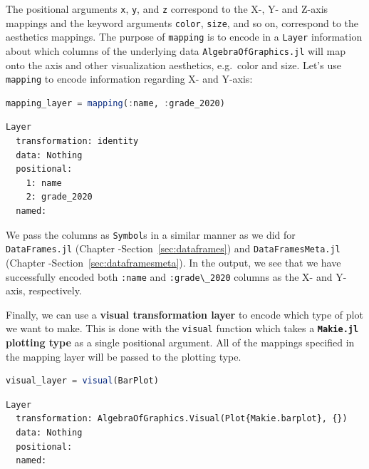 \documentclass[
  notoc %
]{tufte-book}
\newcommand{\passthrough}[1]{#1}
\begin{document}
The positional arguments \passthrough{\lstinline!x!},
\passthrough{\lstinline!y!}, and \passthrough{\lstinline!z!} correspond
to the X-, Y- and Z-axis mappings and the keyword arguments
\passthrough{\lstinline!color!}, \passthrough{\lstinline!size!}, and so
on, correspond to the aesthetics mappings. The purpose of
\passthrough{\lstinline!mapping!} is to encode in a
\passthrough{\lstinline!Layer!} information about which columns of the
underlying data \passthrough{\lstinline!AlgebraOfGraphics.jl!} will map
onto the axis and other visualization aesthetics, e.g.~color and size.
Let's use \passthrough{\lstinline!mapping!} to encode information
regarding X- and Y-axis:

\begin{lstlisting}[language=Julia]
mapping_layer = mapping(:name, :grade_2020)
\end{lstlisting}

\begin{lstlisting}[language=Output]
Layer 
  transformation: identity
  data: Nothing
  positional:
    1: name
    2: grade_2020
  named:

\end{lstlisting}

We pass the columns as \passthrough{\lstinline!Symbol!}s in a similar
manner as we did for \passthrough{\lstinline!DataFrames.jl!} (Chapter
-Section~\ref{sec:dataframes}) and
\passthrough{\lstinline!DataFramesMeta.jl!} (Chapter
-Section~\ref{sec:dataframesmeta}). In the output, we see that we have
successfully encoded both \passthrough{\lstinline!:name!} and
\passthrough{\lstinline!:grade\_2020!} columns as the X- and Y-axis,
respectively.

Finally, we can use a \textbf{visual transformation layer} to encode
which type of plot we want to make. This is done with the
\passthrough{\lstinline!visual!} function which takes a
\textbf{\passthrough{\lstinline!Makie.jl!} plotting type} as a single
positional argument. All of the mappings specified in the mapping layer
will be passed to the plotting type.

\begin{lstlisting}[language=Julia]
visual_layer = visual(BarPlot)
\end{lstlisting}

\begin{lstlisting}[language=Output]
Layer 
  transformation: AlgebraOfGraphics.Visual(Plot{Makie.barplot}, {})
  data: Nothing
  positional:
  named:

\end{lstlisting}
\end{document}
